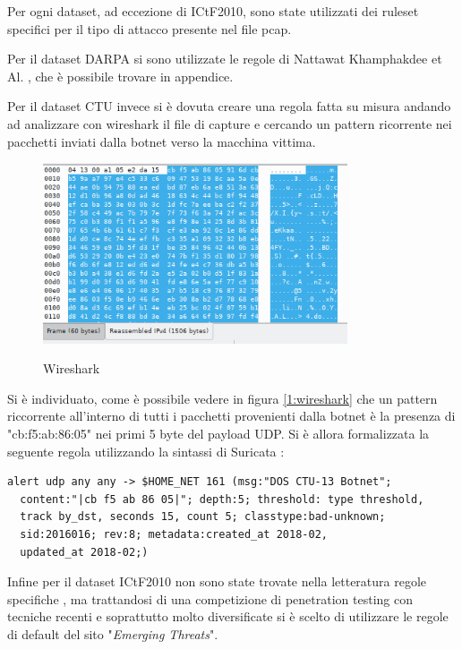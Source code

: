 \documentclass[12pt,a4paper,openright,twoside]{report}
\begin{document}
Per ogni dataset, ad eccezione di ICtF2010, sono state utilizzati dei ruleset
specifici per il tipo di attacco presente nel file pcap.

Per il dataset DARPA si sono utilizzate le regole di Nattawat Khamphakdee et Al. \cite{EXP15},
che \`e possibile trovare in appendice.

Per il dataset CTU invece si \`e dovuta creare una regola fatta su misura andando
ad analizzare con wireshark il file di capture e cercando un pattern ricorrente
nei pacchetti inviati dalla botnet verso la macchina vittima.

\begin{figure}
  \begin{center}                          %
    \includegraphics[width=90mm]{images/wireshark.png}
    \caption{Wireshark}\label{1:wireshark}
    \label{}
  \end{center}
\end{figure}

Si \`e individuato, come \`e possibile vedere in figura \ref{1:wireshark} che un
pattern riccorrente all'interno di tutti i pacchetti provenienti dalla botnet \`e
la presenza di "cb:f5:ab:86:05" nei primi 5 byte del payload UDP.
Si \`e allora formalizzata la seguente regola utilizzando la sintassi di
Suricata \cite{EXP14}:

\begin{verbatim}
alert udp any any -> $HOME_NET 161 (msg:"DOS CTU-13 Botnet";
  content:"|cb f5 ab 86 05|"; depth:5; threshold: type threshold,
  track by_dst, seconds 15, count 5; classtype:bad-unknown;
  sid:2016016; rev:8; metadata:created_at 2018-02,
  updated_at 2018-02;)
\end{verbatim}

Infine per il dataset ICtF2010 non sono state trovate nella letteratura regole specifiche
, ma trattandosi di una competizione di penetration testing con tecniche recenti e
soprattutto molto diversificate si \`e scelto di utilizzare le regole di default del sito
"{\it Emerging Threats}".
\end{document}
